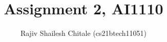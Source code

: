 \documentclass[journal,12pt,twocolumn]{IEEEtran}
\begin{document}
\makeatletter
{}
\makeatother

\let\StandardTheFigure\thefigure
\let\vec\mathbf

\def\putbox#1#2#3{\makebox[0in][l]{\makebox[#1][l]{}\raisebox{\baselineskip}[0in][0in]{\raisebox{#2}[0in][0in]{#3}}}}
     \def\rightbox#1{\makebox[0in][r]{#1}}
     \def\centbox#1{\makebox[0in]{#1}}
     \def\topbox#1{\raisebox{-\baselineskip}[0in][0in]{#1}}
     \def\midbox#1{\raisebox{-0.5\baselineskip}[0in][0in]{#1}}
\vspace{3cm}


\title{Assignment 2, AI1110}
\author{Rajiv Shailesh Chitale (cs21btech11051)}	

\maketitle
\end{document}
